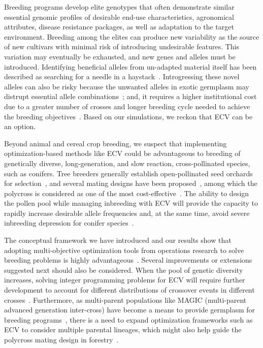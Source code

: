 \documentclass[12pt, a4paper, bibliography=totoc]{scrartcl}
\begin{document}
Breeding programs develop elite genotypes that often demonstrate similar essential genomic profiles of desirable end-use characteristics, agronomical attributes, disease resistance packages, as well as adaptation to the target environment. Breeding among the elites can produce new variability as the source of new cultivars with minimal risk of introducing undesirable features. This variation may eventually be exhausted, and new genes and alleles must be introduced. Identifying beneficial alleles from un-adapted material itself has been described as searching for a needle in a haystack~\citep{pixley2014seeds}. Introgressing these novel alleles can also be risky because the unwanted alleles in exotic germplasm may distrupt essential  allele combinations~\citep{willcox2022mining}; and, it requires a higher institutional cost due to a greater number of crosses and longer breeding cycle needed to achieve the breeding objectives~\citep{snelling2019genetic, neyhart2019multi}. Based on our simulations, we reckon that ECV can be an option. 

Beyond animal and cereal crop breeding, we suspect that implementing optimization-based methods like ECV could be advantageous to breeding of genetically diverse, long-generation, and slow reaction, cross-pollinated species, such as conifers. Tree breeders generally establish open-pollinated seed orchards for selection~\citep{white2007forest}, and several mating designs have been proposed~\citep{nakoonctextordmasculine1976multiple, zobel1984applied}, among which the polycross is considered as one of the most cost-effective~\citep{kumar2007testing, lenz2020genomic}. The ability to design the pollen pool while managing inbreeding with ECV will provide the capacity to rapidly increase desirable allele frequencies and, at the same time, avoid severe inbreeding depression for conifer species~\citep{berry2014genetics, mwansa2002multiple, snelling2019genetic}. 

The conceptual framework we have introduced and our results show that adopting multi-objective optimization tools from operations research to solve breeding problems is highly advantageous~\citep{cameron2017systematic, beans2020inner, kusmec2021interdisciplinary}. Several improvements or extensions suggested next should also be considered. When the pool of genetic diversity increases, solving integer programming problems for ECV will require further development to account for different distributions of crossover events in different crosses~\citep{stapley2017variation,nachman2002variation,jabbari2019common,dreissig2019variation}. Furthermore, as multi-parent populations like MAGIC (multi-parent advanced generation inter-cross) have become a means to provide germplasm for breeding programs~\citep{scott2020multi}, there is a need to expand optimization frameworks such as ECV to consider multiple parental lineages, which might also help guide the polycross mating design in forestry~\citep{frandsen1940some, lambeth2001polymix}. 
\end{document}
